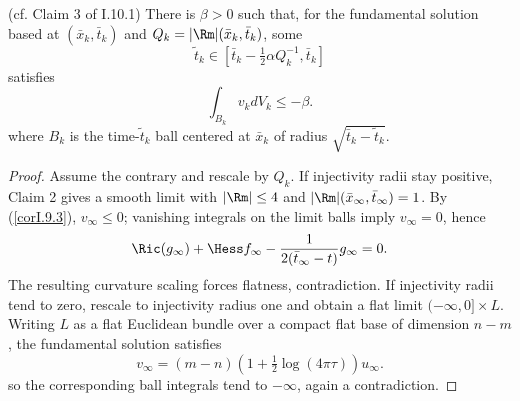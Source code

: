 \begin{lemma}
  \label{lem:kl-upper-bound-integral-integral-bound-pseudolocality-2}
  (cf. Claim 3 of I.10.1) \label{Claim 3}
There is $\beta>0$ such that, for the fundamental solution based at
$(\bar x_k,\bar t_k)$ and $Q_k=|\Rm|(\bar x_k,\bar t_k)$, some
\begin{equation}
\tilde t_k\in[\bar t_k-\tfrac12\alpha Q_k^{-1},\bar t_k]
\end{equation}
satisfies
\begin{equation}\int_{B_k}v_kdV_k\le-\beta.\end{equation}
where $B_k$ is the time-$\tilde t_k$ ball centered at $\bar x_k$ of radius
$\sqrt{\bar t_k-\tilde t_k}$.
\end{lemma}
\begin{proof}
\sketch
Assume the contrary and rescale by $Q_k$. If injectivity radii stay positive,
Claim 2 gives a smooth limit with $|\Rm|\le4$ and $|\Rm|(\bar x_\infty,\bar t_\infty)=1$.
By (\ref{corI.9.3}), $v_\infty\le0$; vanishing integrals on the limit balls imply
$v_\infty=0$, hence
\begin{equation}\Ric(g_\infty)+\Hess f_\infty-{1\over2(\bar t_\infty-t)}g_\infty=0.
\end{equation}
The resulting curvature scaling forces flatness, contradiction. If injectivity
radii tend to zero, rescale to injectivity radius one and obtain a flat limit
$(-\infty,0]\times L$. Writing $L$ as a flat Euclidean bundle over a compact flat
base of dimension $n-m$, the fundamental solution satisfies
\begin{equation}v_\infty=(m-n)\left(1+\tfrac12\log(4\pi\tau)\right)u_\infty.\end{equation}
so the corresponding ball integrals tend to $-\infty$, again a contradiction.
\end{proof}

